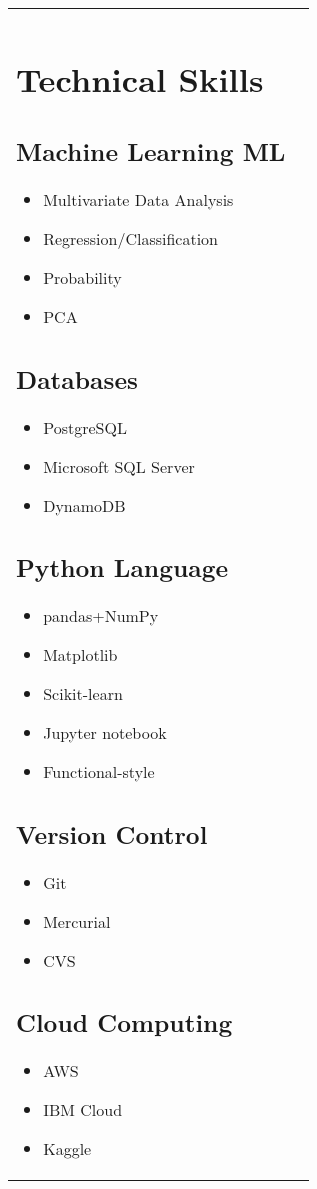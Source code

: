 \documentclass{article}
\begin{document}
\begin{tabular*}{7.5in}{ l | l}
	\begin{minipage}[t]{2.0in}
	\section*{Technical Skills}
	\subsection*{Machine Learning ML}
	\begin{itemize}[noitemsep]
		\item Multivariate Data Analysis
		\item Regression/Classification
		\item Probability
		\item PCA
	\end{itemize}
		\subsection*{Databases}
	\begin{itemize}[noitemsep]
		\item PostgreSQL
		\item Microsoft SQL Server
		\item DynamoDB
	\end{itemize}
	\subsection*{Python Language}	
	\begin{itemize}[noitemsep]
		\item pandas+NumPy
		\item Matplotlib
		\item Scikit-learn
		\item Jupyter notebook
		\item Functional-style
	\end{itemize}
	\subsection*{Version Control}
	\begin{itemize}[noitemsep]
		\item Git
		\item Mercurial
		\item CVS
	\end{itemize}
	\subsection*{Cloud Computing}
	\begin{itemize}[noitemsep]
		\item AWS
		\item IBM Cloud
		\item Kaggle
	\end{itemize}

\end{minipage}
\end{tabular*}
\end{document}
